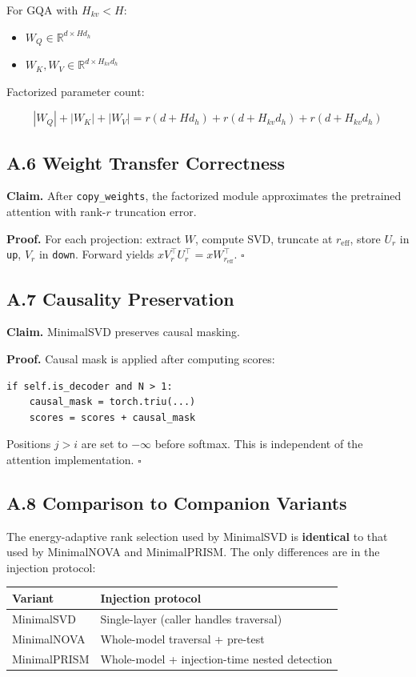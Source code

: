 For GQA with $H_{kv} < H$:
\begin{itemize}
\item $W_Q \in \mathbb{R}^{d \times H d_h}$
\item $W_K, W_V \in \mathbb{R}^{d \times H_{kv} d_h}$

\end{itemize}
Factorized parameter count:

\[
|W_Q| + |W_K| + |W_V| = r(d + H d_h) + r(d + H_{kv} d_h) + r(d + H_{kv} d_h)
\tag{A.4}
\]

\subsection{A.6 Weight Transfer Correctness}

\textbf{Claim.} After \texttt{copy\_weights}, the factorized module approximates the 
pretrained attention with rank-$r$ truncation error.

\textbf{Proof.} For each projection: extract $W$, compute SVD, truncate at 
$r_\text{eff}$, store $U_r$ in \texttt{up}, $V_r$ in \texttt{down}. Forward yields 
$x V_r^\top U_r^\top = x W_{r_\text{eff}}^\top$. $\square$

\subsection{A.7 Causality Preservation}

\textbf{Claim.} MinimalSVD preserves causal masking.

\textbf{Proof.} Causal mask is applied after computing scores:

\begin{lstlisting}
if self.is_decoder and N > 1:
    causal_mask = torch.triu(...)
    scores = scores + causal_mask
\end{lstlisting}

Positions $j > i$ are set to $-\infty$ before softmax. This is independent 
of the attention implementation. $\square$

\subsection{A.8 Comparison to Companion Variants}

The energy-adaptive rank selection used by MinimalSVD is \textbf{identical} to 
that used by MinimalNOVA and MinimalPRISM. The only differences are in the 
injection protocol:

\begin{table}[H]
\centering
\small
\begin{tabular}{ll}
\toprule
\textbf{Variant} & \textbf{Injection protocol} \\
\midrule
MinimalSVD & Single-layer (caller handles traversal) \\
MinimalNOVA & Whole-model traversal + pre-test \\
MinimalPRISM & Whole-model + injection-time nested detection \\
\bottomrule
\end{tabular}
\end{table}

